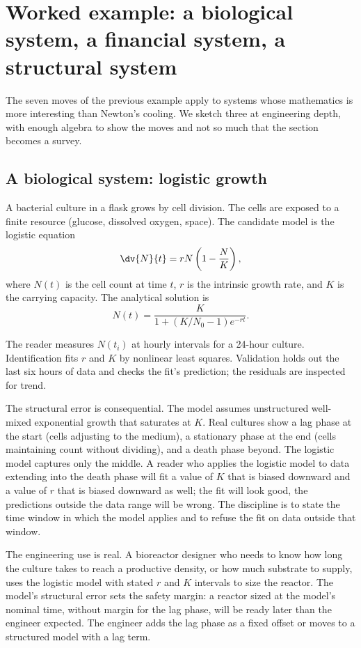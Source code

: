 \section{Worked example: a biological system, a financial system, a structural system}

The seven moves of the previous example apply to systems whose
mathematics is more interesting than Newton's cooling. We sketch
three at engineering depth, with enough algebra to show the
moves and not so much that the section becomes a survey.

\subsection{A biological system: logistic growth}

A bacterial culture in a flask grows by cell division. The cells
are exposed to a finite resource (glucose, dissolved oxygen,
space). The candidate model is the logistic equation
\[
\dv{N}{t} = r N \left(1 - \frac{N}{K}\right),
\]
where $N(t)$ is the cell count at time $t$, $r$ is the
intrinsic growth rate, and $K$ is the carrying capacity. The
analytical solution is
\[
N(t) = \frac{K}{1 + \left(K/N_{0} - 1\right) e^{-rt}}.
\]

The reader measures $N(t_{i})$ at hourly intervals for a 24-hour
culture. Identification fits $r$ and $K$ by nonlinear least
squares. Validation holds out the last six hours of data and
checks the fit's prediction; the residuals are inspected for
trend.

The structural error is consequential. The model assumes
unstructured well-mixed exponential growth that saturates at
$K$. Real cultures show a lag phase at the start (cells
adjusting to the medium), a stationary phase at the end
(cells maintaining count without dividing), and a death phase
beyond. The logistic model captures only the middle. A reader
who applies the logistic model to data extending into the
death phase will fit a value of $K$ that is biased downward
and a value of $r$ that is biased downward as well; the fit
will look good, the predictions outside the data range will
be wrong. The discipline is to state the time window in which
the model applies and to refuse the fit on data outside that
window.

The engineering use is real. A bioreactor designer who needs
to know how long the culture takes to reach a productive
density, or how much substrate to supply, uses the logistic
model with stated $r$ and $K$ intervals to size the reactor.
The model's structural error sets the safety margin: a
reactor sized at the model's nominal time, without margin
for the lag phase, will be ready later than the engineer
expected. The engineer adds the lag phase as a fixed offset
or moves to a structured model with a lag term.

